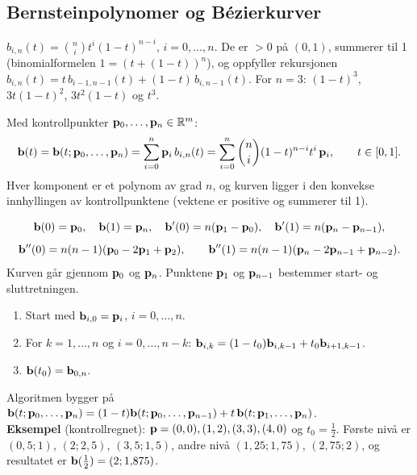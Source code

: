 \subsection{Bernsteinpolynomer og Bézierkurver}
\begin{defn}[Bernsteinpolynomer]
$b_{i,n}(t)=\binom ni t^i(1-t)^{n-i}$, $i=0,\dots,n$. De er $>0$ på $(0,1)$, summerer til 1 (binomialformelen $1=(t+(1-t))^n$), og oppfyller rekursjonen $b_{i,n}(t)=t\,b_{i-1,n-1}(t)+(1-t)\,b_{i,n-1}(t)$.
For $n=3$: $(1-t)^3$, $3t(1-t)^2$, $3t^2(1-t)$ og $t^3$.
\end{defn}
\begin{defn}[Bézierkurve]
Med kontrollpunkter $\mathbf{p}_0,\dots,\mathbf{p}_n\in\mathbb{R}^m$:
\[
\mathbf{b}(t)=\mathbf{b}(t;\mathbf{p}_0,\dots,\mathbf{p}_n)=\sum_{i=0}^n\mathbf{p}_i\,b_{i,n}(t)=\sum_{i=0}^n\binom ni(1-t)^{n-i}t^i\,\mathbf{p}_i,\qquad t\in[0,1].
\]
Hver komponent er et polynom av grad $n$, og kurven ligger i den konvekse innhyllingen av kontrollpunktene (vektene er positive og summerer til 1).
\end{defn}
\begin{teorem}
\[
\mathbf{b}(0)=\mathbf{p}_0,\quad \mathbf{b}(1)=\mathbf{p}_n,\quad \mathbf{b}'(0)=n(\mathbf{p}_1-\mathbf{p}_0),\quad \mathbf{b}'(1)=n(\mathbf{p}_n-\mathbf{p}_{n-1}),
\]
\[
\mathbf{b}''(0)=n(n-1)(\mathbf{p}_0-2\mathbf{p}_1+\mathbf{p}_2),\qquad \mathbf{b}''(1)=n(n-1)(\mathbf{p}_n-2\mathbf{p}_{n-1}+\mathbf{p}_{n-2}).
\]
Kurven går gjennom $\mathbf{p}_0$ og $\mathbf{p}_n$. Punktene $\mathbf{p}_1$ og $\mathbf{p}_{n-1}$ bestemmer start- og sluttretningen.
\end{teorem}
\begin{oppskrift}
\begin{enumerate}
  \item Start med $\mathbf{b}_{i,0}=\mathbf{p}_i$, $i=0,\dots,n$.
  \item For $k=1,\dots,n$ og $i=0,\dots,n-k$: $\mathbf{b}_{i,k}=(1-t_0)\mathbf{b}_{i,k-1}+t_0\mathbf{b}_{i+1,k-1}$.
  \item $\mathbf{b}(t_0)=\mathbf{b}_{0,n}$.
\end{enumerate}
Algoritmen bygger på $\mathbf{b}(t;\mathbf{p}_0,\dots,\mathbf{p}_n)=(1-t)\mathbf{b}(t;\mathbf{p}_0,\dots,\mathbf{p}_{n-1})+t\,\mathbf{b}(t;\mathbf{p}_1,\dots,\mathbf{p}_n)$.\\
\textbf{Eksempel} (kontrollregnet): $\mathbf{p}=(0,0),(1,2),(3,3),(4,0)$ og $t_0=\frac12$. Første nivå er $(0{,}5;1)$, $(2;2{,}5)$, $(3{,}5;1{,}5)$, andre nivå $(1{,}25;1{,}75)$, $(2{,}75;2)$, og resultatet er $\mathbf{b}(\frac12)=(2;1{,}875)$.
\end{oppskrift}
